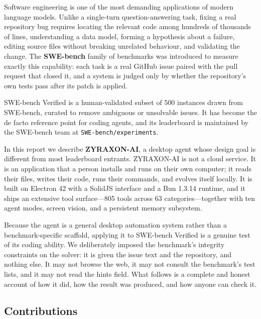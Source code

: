 \documentclass[11pt,a4paper]{article}
\begin{document}
Software engineering is one of the most demanding applications of modern language
models. Unlike a single-turn question-answering task, fixing a real repository bug
requires locating the relevant code among hundreds of thousands of lines, understanding
a data model, forming a hypothesis about a failure, editing source files without
breaking unrelated behaviour, and validating the change. The \textbf{SWE-bench} family
of benchmarks \cite{jimenez2024swebench} was introduced to measure exactly this
capability: each task is a real GitHub issue paired with the pull request that closed
it, and a system is judged only by whether the repository's own tests pass after its
patch is applied.

SWE-bench Verified \cite{openai2024verified} is a human-validated subset of 500
instances drawn from SWE-bench, curated to remove ambiguous or unsolvable issues. It has
become the de facto reference point for coding agents, and its leaderboard is
maintained by the SWE-bench team at \texttt{SWE-bench/experiments}.

In this report we describe \textbf{ZYRAXON-AI}, a desktop agent whose design goal is
different from most leaderboard entrants. ZYRAXON-AI is not a cloud service. It is an
application that a person installs and runs on their own computer; it reads their files,
writes their code, runs their commands, and evolves itself locally. It is built on
Electron 42 with a SolidJS interface and a Bun 1.3.14 runtime, and it ships an extensive
tool surface---805 tools across 63 categories---together with ten agent modes, screen
vision, and a persistent memory subsystem.

Because the agent is a general desktop automation system rather than a benchmark-specific
scaffold, applying it to SWE-bench Verified is a genuine test of its coding ability. We
deliberately imposed the benchmark's integrity constraints on the solver: it is given the
issue text and the repository, and nothing else. It may not browse the web, it may not
consult the benchmark's test lists, and it may not read the hints field. What follows is
a complete and honest account of how it did, how the result was produced, and how anyone
can check it.

\subsection{Contributions}
\end{document}
